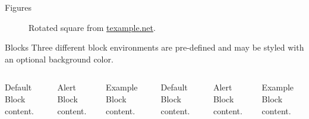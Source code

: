 \documentclass[10pt,dvipsnames]{beamer}
\begin{document}
\begin{frame}{Figures}
  \begin{figure}
    \setcounter{density}{20}
    \caption{Rotated square from
    \href{http://www.texample.net/tikz/examples/rotated-polygons/}{texample.net}.}
  \end{figure}
\end{frame}

\begin{frame}{Blocks}
  Three different block environments are pre-defined and may be styled with an
  optional background color.

  \begin{columns}[T,onlytextwidth]
      \begin{block}{Default}
        Block content.
      \end{block}

      \begin{alertblock}{Alert}
        Block content.
      \end{alertblock}

      \begin{exampleblock}{Example}
        Block content.
      \end{exampleblock}



      \begin{block}{Default}
        Block content.
      \end{block}

      \begin{alertblock}{Alert}
        Block content.
      \end{alertblock}

      \begin{exampleblock}{Example}
        Block content.
      \end{exampleblock}

  \end{columns}
\end{frame}
\end{document}
